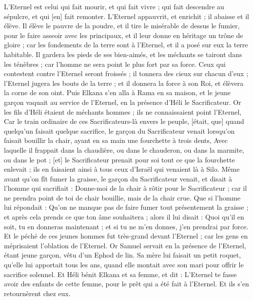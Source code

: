 \begin{multicols}{2}
L'Eternel est celui qui fait mourir, et qui fait vivre ; qui fait descendre au sépulcre, et qui [en] fait remonter.
L'Eternel appauvrit, et enrichit ; il abaisse et il élève.
Il élève le pauvre de la poudre, et il tire le misérable de dessus le fumier, pour le faire asseoir avec les principaux, et il leur donne en héritage un trône de gloire ; car les fondements de la terre sont à l'Eternel, et il a posé sur eux la terre habitable.
Il gardera les pieds de ses bien-aimés, et les méchants se tairont dans les ténèbres ; car l'homme ne sera point le plus fort par sa force.
Ceux qui contestent contre l'Eternel seront froissés ; il tonnera des cieux sur chacun d'eux ; l'Eternel jugera les bouts de la terre ; et il donnera la force à son Roi, et élèvera la corne de son oint.
Puis Elkana s'en alla à Rama en sa maison, et le jeune garçon vaquait au service de l'Eternel, en la présence d'Héli le Sacrificateur.
Or les fils d'Héli étaient de méchants hommes ; ils ne connaissaient point l'Eternel,
Car le train ordinaire de ces Sacrificateurs-là envers le peuple, [était, que] quand quelqu'un faisait quelque sacrifice, le garçon du Sacrificateur venait lorsqu'on faisait bouillir la chair, ayant en sa main une fourchette à trois dents,
Avec laquelle il frappait dans la chaudière, ou dans le chauderon, ou dans la marmite, ou dans le pot ; [et] le Sacrificateur prenait pour soi tout ce que la fourchette enlevait ; ils en faisaient ainsi à tous ceux d'Israël qui venaient là à Silo.
Même avant qu'on fît fumer la graisse, le garçon du Sacrificateur venait, et disait à l'homme qui sacrifiait : Donne-moi de la chair à rôtir pour le Sacrificateur ; car il ne prendra point de toi de chair bouillie, mais de la chair crue.
Que si l'homme lui répondait : Qu'on ne manque pas de faire fumer tout présentement la graisse ; et après cela prends ce que ton âme souhaitera ; alors il lui disait : Quoi qu'il en soit, tu en donneras maintenant ; et si tu ne m'en donnes, j'en prendrai par force.
Et le péché de ces jeunes hommes fut très-grand devant l'Eternel ; car les gens en méprisaient l'oblation de l'Eternel.
Or Samuel servait en la présence de l'Eternel, étant jeune garçon, vêtu d'un Ephod de lin.
Sa mère lui faisait un petit roquet, qu'elle lui apportait tous les ans, quand elle montait avec son mari pour offrir le sacrifice solennel.
Et Héli bénit Elkana et sa femme, et dit : L'Eternel te fasse avoir des enfants de cette femme, pour le prêt qui a été fait à l'Eternel. Et ils s'en retournèrent chez eux.

\end{multicols}
